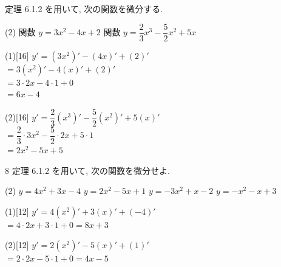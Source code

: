 \documentclass[14pt,dvipdfmx]{jsarticle}
\begin{document}
\vfill
\nextpage

\vspace{-1.4zw}%
\quad
定理 6.1.2 を用いて, 次の関数を微分する.
\begin{tasks}[label=(\arabic*), label-width=1.6zw, item-indent=2zw, after-item-skip=0.08em](2)
  \task 関数 $y=3x^{2}-4x+2$
  \task 関数 $y=\dfrac{2}{3}x^{3}-\dfrac{5}{2}x^{2}+5x$
\end{tasks}
\vspace{-0.55em}
\noindent
\begin{minipage}[t]{0.49\linewidth}
\begin{answerbox}{(1)}[16]
  $y'=(3x^{2})'-(4x)'+(2)'$\\[0.2em]
  $=3(x^{2})'-4(x)'+(2)'$\\[0.2em]
  $=3\cdot 2x-4\cdot 1+0$\\[0.2em]
  $=6x-4$
\end{answerbox}
\end{minipage}\hfill
\begin{minipage}[t]{0.49\linewidth}
\begin{answerbox}{(2)}[16]
  $y'=\dfrac{2}{3}(x^{3})'-\dfrac{5}{2}(x^{2})'+5(x)'$\\[0.25em]
  $=\dfrac{2}{3}\cdot 3x^{2}-\dfrac{5}{2}\cdot 2x+5\cdot 1$\\[0.25em]
  $=2x^{2}-5x+5$
\end{answerbox}
\end{minipage}

\vspace{0.15em}
\begin{practiceprob}{8}
  定理 6.1.2 を用いて, 次の関数を微分せよ.
  \begin{tasks}[label=(\arabic*), label-width=1.6zw, item-indent=2zw, after-item-skip=0.06em](2)
    \task $y=4x^{2}+3x-4$
    \task $y=2x^{2}-5x+1$
    \task $y=-3x^{2}+x-2$
    \task $y=-x^{2}-x+3$
  \end{tasks}
\end{practiceprob}
\vspace{-0.7em}
\noindent
\begin{minipage}[t]{0.49\linewidth}
\begin{answerbox}{(1)}[12]
  $y'=4(x^{2})'+3(x)'+(-4)'$\\[0.25em]
  $=4\cdot 2x+3\cdot 1+0=8x+3$
\end{answerbox}
\end{minipage}\hfill
\begin{minipage}[t]{0.49\linewidth}
\begin{answerbox}{(2)}[12]
  $y'=2(x^{2})'-5(x)'+(1)'$\\[0.25em]
  $=2\cdot 2x-5\cdot 1+0=4x-5$
\end{answerbox}
\end{minipage}
\end{document}
